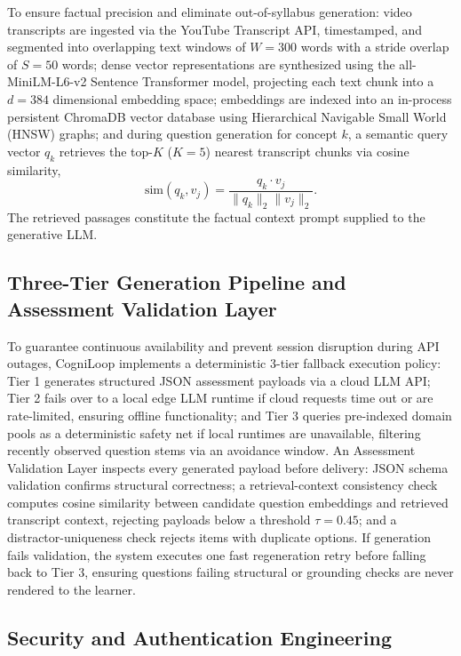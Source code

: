 \documentclass[pdflatex,sn-apa]{sn-jnl}
\begin{document}
To ensure factual precision and eliminate out-of-syllabus generation: video transcripts are ingested via the YouTube Transcript API, timestamped, and segmented into overlapping text windows of $W=300$ words with a stride overlap of $S=50$ words; dense vector representations are synthesized using the all-MiniLM-L6-v2 Sentence Transformer model, projecting each text chunk into a $d=384$ dimensional embedding space; embeddings are indexed into an in-process persistent ChromaDB vector database using Hierarchical Navigable Small World (HNSW) graphs; and during question generation for concept $k$, a semantic query vector $q_k$ retrieves the top-$K$ ($K=5$) nearest transcript chunks via cosine similarity,
\begin{equation}
\text{sim}(q_k, v_j) = \frac{q_k \cdot v_j}{\|q_k\|_2 \|v_j\|_2}.\label{eq0}
\end{equation}
The retrieved passages constitute the factual context prompt supplied to the generative LLM.

\subsection{Three-Tier Generation Pipeline and Assessment Validation Layer}\label{sec3.3}

To guarantee continuous availability and prevent session disruption during API outages, CogniLoop implements a deterministic 3-tier fallback execution policy: Tier 1 generates structured JSON assessment payloads via a cloud LLM API; Tier 2 fails over to a local edge LLM runtime if cloud requests time out or are rate-limited, ensuring offline functionality; and Tier 3 queries pre-indexed domain pools as a deterministic safety net if local runtimes are unavailable, filtering recently observed question stems via an avoidance window. An Assessment Validation Layer inspects every generated payload before delivery: JSON schema validation confirms structural correctness; a retrieval-context consistency check computes cosine similarity between candidate question embeddings and retrieved transcript context, rejecting payloads below a threshold $\tau=0.45$; and a distractor-uniqueness check rejects items with duplicate options. If generation fails validation, the system executes one fast regeneration retry before falling back to Tier 3, ensuring questions failing structural or grounding checks are never rendered to the learner.

\subsection{Security and Authentication Engineering}\label{sec3.4}
\end{document}
